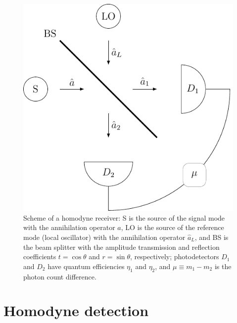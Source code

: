 \documentclass[%
reprint,
superscriptaddress,
 amsmath,amssymb,amsfonts,
 aps,
 pra,
 longbibliography
]{revtex4-2}
\begin{document}
\begin{figure}
    \centering
    \includegraphics[width=0.9\linewidth]{pics/schemes/homodyne.pdf}
    \caption{Scheme of a homodyne receiver: S is the source of the
      signal mode with the annihilation operator $\hat{a}$,
      LO is the source of the reference mode (local oscillator) with the annihilation
      operator $\hat{a}_{L}$, and BS is the beam splitter with
      the amplitude transmission and reflection coefficients
      $t=\cos\theta$ and $r=\sin\theta$, respectively; photodetectors $D_1$ and $D_2$ have quantum efficiencies
     $\eta_{1}$ and $\eta_{2}$, and $\mu\equiv m_1-m_2$ is the photon count
      difference.}
    \label{fig:homodyne}
\end{figure}

\section{Homodyne detection}
\label{sec:homodyne} 
\end{document}
